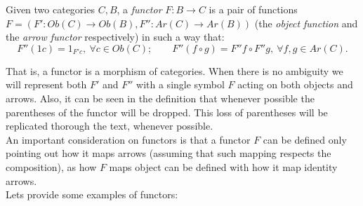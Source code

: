 \begin{definition}
  Given two categories $C, B$, a \emph{functor} $F: B \to C$ is a pair of functions $F=(F':Ob(C)\to Ob(B),F'':Ar(C)\to Ar(B))$ (the \emph{object function} and the \emph{arrow functor} respectively) in such a way that:
  $$F''(1c) = 1_{F'c}, \ \forall c \in Ob(C); \qquad F''(f\circ g) = F''f \circ F''g, \ \forall f,g  \in Ar(C).$$

\end{definition}


That is,  a functor is a morphism of categories. When there is no ambiguity we will represent both $F'$ and $F''$ with a single symbol $F$ acting on both objects and arrows. Also, it can be seen in the definition that whenever possible the parentheses of the functor will be dropped. This loss of parentheses will be replicated thorough the text, whenever possible.\\



An  important consideration on functors is that a functor $F$ can be defined only pointing out how it maps arrows (assuming that such mapping respects the composition), as how $F$ maps object can be defined with how it map identity arrows.\\

Lets provide some examples of functors:\\



